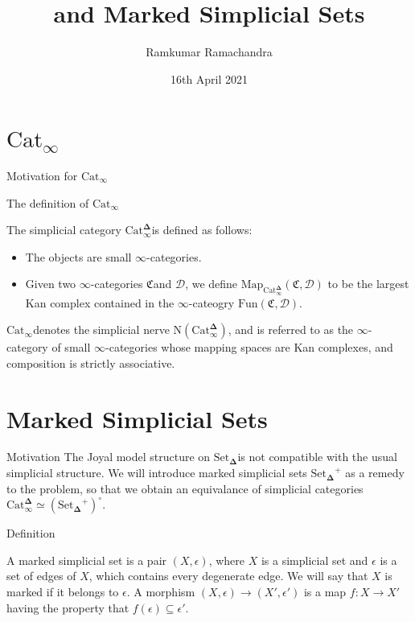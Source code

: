 \documentclass{beamer}[9pt]
\title{\texorpdfstring{\Catinf}{Cat∞} and Marked Simplicial Sets}
\author{Ramkumar Ramachandra}
\date{16th April 2021}
\institute{Université de Paris}
\newcommand{\8}{\ensuremath{\infty}}
\newcommand{\C}{\ensuremath{\mathfrak{C}}}
\newcommand{\D}{\ensuremath{\mathscr{D}}}
\newcommand{\SSet}{\ensuremath{\text{Set}_{\boldsymbol{\Delta}}}}
\newcommand{\Catinfdel}{\ensuremath{\text{Cat}^{\boldsymbol{\Delta}}_{\infty}}}
\newcommand{\Catinf}{\ensuremath{\text{Cat}_{\infty}}}
\newcommand{\Map}{\ensuremath{\text{Map}}}
\newcommand{\Fun}{\ensuremath{\text{Fun}}}
\begin{document}
\begin{frame}
  \titlepage
\end{frame}

\section{\texorpdfstring{\Catinf}{Cat∞}}

\begin{frame}{Motivation for \texorpdfstring{\Catinf}{Cat∞}}
\end{frame}

\begin{frame}{The definition of \texorpdfstring{\Catinf}{Cat∞}}
  \begin{definition}[\texorpdfstring{\Catinf}{Cat∞}]
    The simplicial category \Catinfdel is defined as follows:
    \begin{itemize}
      \item The objects are small \8-categories.
      \item Given two \8-categories \C and \D, we define $\Map_{\Catinfdel}(\C, \D)$ to be the largest Kan complex contained in the \8-cateogry $\Fun(\C, \D)$.
    \end{itemize}
  \end{definition}

  \Catinf denotes the simplicial nerve $\text{N}(\Catinfdel)$, and is referred to as the \8-category of small \8-categories whose mapping spaces are Kan complexes, and composition is strictly associative.
\end{frame}

\section{Marked Simplicial Sets}

\begin{frame}{Motivation}
  The Joyal model structure on \SSet is not compatible with the usual simplicial structure. We will introduce marked simplicial sets $\SSet^+$ as a remedy to the problem, so that we obtain an equivalance of simplicial categories $\Catinfdel \simeq (\SSet^+)^\circ$.
\end{frame}


\begin{frame}{Definition}
  \begin{definition}
    A marked simplicial set is a pair $(X, \epsilon)$, where $X$ is a simplicial set and $\epsilon$ is a set of edges of $X$, which contains every degenerate edge. We will say that $X$ is marked if it belongs to $\epsilon$. A morphism $(X, \epsilon) \rightarrow (X', \epsilon')$ is a map $f : X \rightarrow X'$ having the property that $f(\epsilon) \subseteq \epsilon'$.
  \end{definition}
\end{frame}
\end{document}
